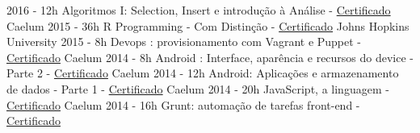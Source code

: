 \begin{entrylistii}
  \entryii
    {2016 - 12h}
    {Algoritmos I: Selection, Insert e introdução à Análise - \href{https://www.alura.com.br/certificate/09f59aea91197391c056690037d6858f}{Certificado}}
    {Caelum}
  \entryii
    {2015 - 36h}
    {R Programming - Com Distinção - \href{https://www.coursera.org/account/accomplishments/records/p3u7HG52CSE2qRGP}{Certificado}}
    {Johns Hopkins University}
  \entryii
    {2015 - 8h}
    {Devops : provisionamento com Vagrant e Puppet - \href{https://www.alura.com.br/user/3311/fullCertificate/bdd8817990ef209f0fb6b049f2d2ea0c}{Certificado}}
    {Caelum}
  \entryii
    {2014 - 8h}
    {Android : Interface, aparência e recursos do device - Parte 2 - \href{https://www.alura.com.br/user/3311/fullCertificate/bdd8817990ef209f0fb6b049f2d2ea0c}{Certificado}}
    {Caelum}
  \entryii
    {2014 - 12h}
    {Android: Aplicações e armazenamento de dados - Parte 1 - \href{https://www.alura.com.br/user/3311/fullCertificate/bdd8817990ef209f0fb6b049f2d2ea0c}{Certificado}}
    {Caelum}    
  \entryii
    {2014 - 20h}
    {JavaScript, a linguagem - \href{https://www.alura.com.br/user/3311/fullCertificate/bdd8817990ef209f0fb6b049f2d2ea0c}{Certificado}}
    {Caelum}
  \entryii
    {2014 - 16h}
    {Grunt: automação de tarefas front-end - \href{https://www.alura.com.br/user/3311/fullCertificate/bdd8817990ef209f0fb6b049f2d2ea0c}{Certificado}}

\end{entrylistii}

